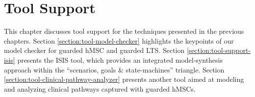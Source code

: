 \chapter{Tool Support\label{chapter:tool-support}}

This chapter discusses tool support for the techniques presented in the previous chapters. Section \ref{section:tool-model-checker} highlights the keypoints of our model checker for guarded hMSC and guarded LTS. Section \ref{section:tool-support-isis} presents the ISIS tool, which provides an integrated model-synthesis approach within the ``scenarios, goals $\&$ state-machines'' triangle. Section \ref{section:tool-clinical-pathway-analyzer} presents another tool aimed at modeling and analyzing clinical pathways captured with guarded hMSCs.





